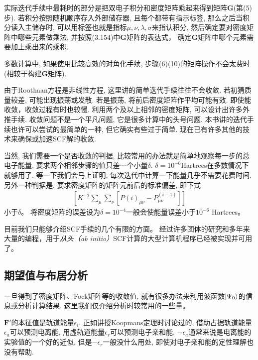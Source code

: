 实际迭代手续中最耗时的部分是把双电子积分和密度矩阵乘起来得到矩阵$\mathbf{G}$(第(5)步). 
若积分按照随机顺序存入外部储存器, 
且每个都带有指示标签, 
那么之后当积分读入主储存时, 
可以用标签也就是指标$\mu,\nu,\lambda,\sigma$来指认积分, 
然后确定要对密度矩阵中哪些元素做乘法, 
并按照(3.154)中$\mathbf{G}$矩阵的表达式， 
确定$\mathbf{G}$矩阵中哪个元素需要加上乘出来的乘积.


多数计算中, 
如果使用比较高效的对角化手续, 
步骤(6)(10)的矩阵操作不会太费时(相较于构建$\mathbf{G}$矩阵).


由于Roothaan方程是非线性方程, 
这里讲的简单迭代手续往往不会收敛. 
若初猜质量较差, 
可能出现振荡或发散. 
若是振荡, 
将前后密度矩阵作平均可能有效. 
即使能收敛，收敛过程有时也较慢. 
利用两个及以上相邻的密度矩阵, 
可以设计出许多外推手续. 
收敛问题不是一个平凡问题, 
它是很多计算中的头号问题. 
本书讲的迭代手续也许可以尝试的最简单的一种, 
但它确实有些过于简单. 
现在已有许多其他的技术来确保或加速SCF解的收敛.


当然, 
我们需要一个是否收敛的判据, 
比较常用的办法就是简单地观察每一步的总电子能量, 
要求两个相邻步骤的值只差一个小量$\delta$. 
$\delta=10^{-6}$Hartrees在多数情况下就够用了. 
等一下我们会马上证明, 
每次迭代中计算一下能量几乎不需要花费时间. 
另外一种判据是, 
要求密度矩阵的矩阵元前后的标准偏差, 
即下式
\begin{align*}
	\left[ K^{-2}\sum_\mu\sum_\nu[P{(i)}_{\mu\nu}-P^{(i-1)}_{\mu\nu} ] \right]
\end{align*} 
小于$\delta$。
将密度矩阵的误差设为$\delta=10^{-4}$一般会使能量误差小于$10^{-6}$ Hartrees。


目前我们只能够介绍SCF手续的几个有限的方面。 
经过许多团体的研究和多年来大量的编程，用于\emph{从头（ab initio）}SCF计算的大型计算机程序已经被实现并可用了。 

\subsection{期望值与布居分析}
一旦得到了密度矩阵、Fock矩阵等的收敛值, 
就有很多办法来利用波函数$\Ket{\Psi_0}$的信息或分析计算结果. 
这里我们仅介绍分析时较常用的一些量。


$\mathbf{F'}$的本征值是轨道能量$\epsilon_i$. 
正如讲授Koopmans定理时讨论过的, 借助占据轨道能量$\epsilon_a$可以预测电离能, 用虚轨道能量$\epsilon_r$可以预测电子亲和能. $-\epsilon_a$通常来说是电离能的实验值的一个好的近似, 但是$-\epsilon_r$一般没什么用处, 即使对电子亲和能的定性理解也没有帮助.

